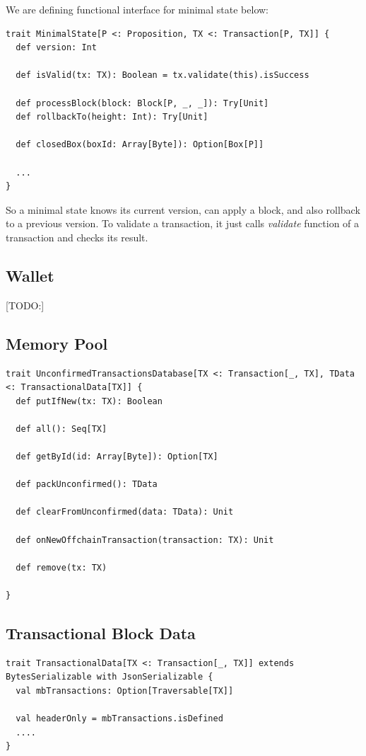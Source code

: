 \documentclass[]{report}   %
\begin{document}
We are defining functional interface for minimal state below:

\begin{lstlisting}
trait MinimalState[P <: Proposition, TX <: Transaction[P, TX]] {
  def version: Int

  def isValid(tx: TX): Boolean = tx.validate(this).isSuccess

  def processBlock(block: Block[P, _, _]): Try[Unit]
  def rollbackTo(height: Int): Try[Unit]

  def closedBox(boxId: Array[Byte]): Option[Box[P]]

  ...
}
\end{lstlisting}

So a minimal state knows its current version, can apply a block, and also rollback to a previous version. To validate a transaction, it just calls \textit{validate} function of a transaction and checks its result.

\subsection{Wallet}

[TODO:]

\subsection{Memory Pool}

\begin{lstlisting}
trait UnconfirmedTransactionsDatabase[TX <: Transaction[_, TX], TData <: TransactionalData[TX]] {
  def putIfNew(tx: TX): Boolean

  def all(): Seq[TX]

  def getById(id: Array[Byte]): Option[TX]

  def packUnconfirmed(): TData

  def clearFromUnconfirmed(data: TData): Unit

  def onNewOffchainTransaction(transaction: TX): Unit

  def remove(tx: TX)
  
}
\end{lstlisting}

\subsection{Transactional Block Data}

\begin{lstlisting}
trait TransactionalData[TX <: Transaction[_, TX]] extends BytesSerializable with JsonSerializable {
  val mbTransactions: Option[Traversable[TX]]

  val headerOnly = mbTransactions.isDefined
  ....
}
\end{lstlisting}
\end{document}
